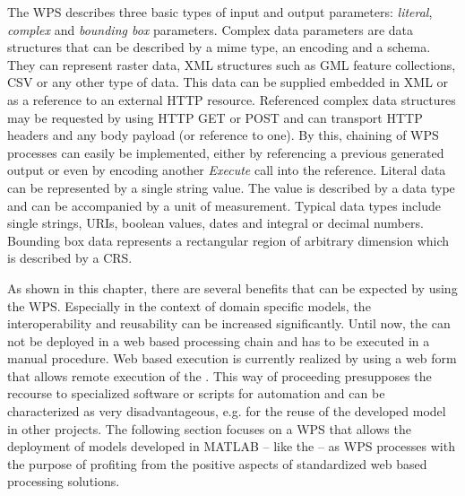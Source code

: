 	The \ac{WPS} describes three basic types of input and output parameters: \emph{literal}, \emph{complex} and \emph{bounding box} parameters. Complex data parameters are data structures that can be described by a mime type, an encoding and a schema. They can represent raster data, XML structures such as \ac{GML} \citep{ogc:gml} feature collections, \ac{CSV} or any other type of data. This data can be supplied embedded in XML or as a reference to an external HTTP resource. Referenced complex data structures may be requested by using HTTP GET or POST and can transport HTTP headers and any body payload (or reference to one). By this, chaining of \ac{WPS} processes can easily be implemented, either by referencing a previous generated output or even by encoding another \emph{Execute} call into the reference. Literal data can be represented by a single string value. The value is described by a data type and can be accompanied by a unit of measurement. Typical data types include single strings, URIs, boolean values, dates and integral or decimal numbers. Bounding box data represents a rectangular region of arbitrary dimension which is described by a \ac{CRS}.

	As shown in this chapter, there are several benefits that can be expected by using the WPS. Especially in the context of domain specific models, the interoperability and reusability can be increased significantly. Until now, the \la can not be deployed in a web based processing chain and has to be executed in a manual procedure. Web based execution is currently realized by using a web form that allows remote execution of the \la. This way of proceeding presupposes the recourse to specialized software or scripts for automation and can be characterized as very disadvantageous, e.g. for the reuse of the developed model in other projects. The following section focuses on a WPS that allows the deployment of models developed in MATLAB -- like the \la -- as WPS processes with the purpose of profiting from the positive aspects of standardized web based processing solutions.

